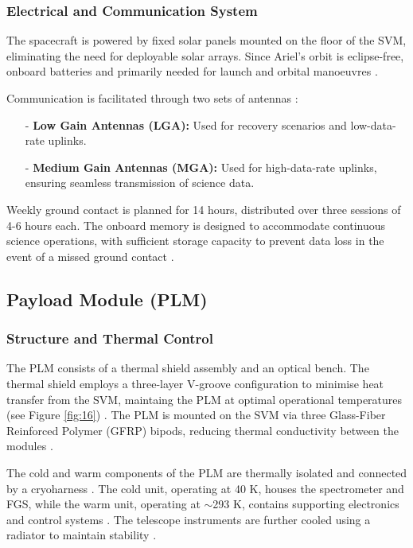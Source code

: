 \documentclass[12pt]{article}
\begin{document}
\subsubsection{Electrical and Communication System} \label{sec:4.1.4}

The spacecraft is powered by fixed solar panels mounted on the floor of the SVM, eliminating the need for deployable solar arrays. Since Ariel's orbit is eclipse-free, onboard batteries and primarily needed for launch and orbital manoeuvres \cite{arielassessreport}.

Communication is facilitated through two sets of antennas \cite{arielassessreport}:

\begin{itemize}
    \item[-] \textbf{Low Gain Antennas (LGA):} Used for recovery scenarios and low-data-rate uplinks.
    \item[-] \textbf{Medium Gain Antennas (MGA):} Used for high-data-rate uplinks, ensuring seamless transmission of science data.
\end{itemize}

Weekly ground contact is planned for 14 hours, distributed over three sessions of 4-6 hours each. The onboard memory is designed to accommodate continuous science operations, with sufficient storage
capacity to prevent data loss in the event of a missed ground contact \cite{arielassessreport}.

\subsection{Payload Module (PLM)} \label{sec:4.2}

\subsubsection{Structure and Thermal Control} \label{sec:4.2.1}

The PLM consists of a thermal shield assembly and an optical bench. The thermal shield employs a three-layer V-groove configuration to minimise heat transfer from the SVM, maintaing the PLM at optimal operational temperatures (see Figure \ref{fig:16}) \cite{salvignol2024ariel,morgante2022thermal}.
The PLM is mounted on the SVM via three Glass-Fiber Reinforced Polymer (GFRP) bipods, reducing thermal conductivity between the modules \cite{morgante2022thermal}.

The cold and warm components of the PLM are thermally isolated and connected by a cryoharness \cite{arielassessreport,morgante2022thermal,ARIEL_M4_Proposal}. The cold unit, operating at 40 K, houses the spectrometer and FGS, while the warm unit, operating at $\sim$293 K, contains supporting 
electronics and control systems \cite{ARIEL_M4_Proposal}. The telescope instruments are further cooled using a radiator to maintain stability \cite{morgante2022thermal,arielassessreport}.
\end{document}
